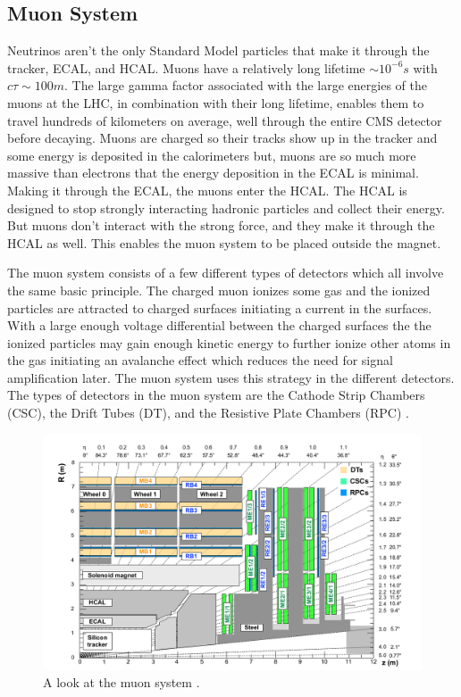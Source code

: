 \subsection{Muon System}
Neutrinos aren't the only Standard Model particles that make it through the tracker, ECAL, and HCAL. Muons have a relatively long lifetime $\sim 10^{-6} s$  with $c\tau \sim 100 m$. The large gamma factor associated with the large energies of the muons at the LHC, in combination with their long lifetime, enables them to travel hundreds of kilometers on average, well through the entire CMS detector before decaying. Muons are charged so their tracks show up in the tracker and some energy is deposited in the calorimeters but, muons are so much more massive than electrons that the energy deposition in the ECAL is minimal. Making it through the ECAL, the muons enter the HCAL. The HCAL is designed to stop strongly interacting hadronic particles and collect their energy. But muons don't interact with the strong force, and they make it through the HCAL as well. This enables the muon system to be placed outside the magnet.

The muon system consists of a few different types of detectors which all involve the same basic principle. The charged muon ionizes some gas and the ionized particles are attracted to charged surfaces initiating a current in the surfaces. With a large enough voltage differential between the charged surfaces the the ionized particles may gain enough kinetic energy to further ionize other atoms in the gas initiating an avalanche effect which reduces the need for signal amplification later. The muon system uses this strategy in the different detectors. The types of detectors in the muon system are the Cathode Strip Chambers (CSC), the Drift Tubes (DT), and the Resistive Plate Chambers (RPC) \cite{tdr}.

\begin{figure}[h!]
  \centering
  \includegraphics[width=5.5in]{images/muon_system.png}
  \caption[A look at the muon system.]
   {A look at the muon system \cite{muonsys}.}
  \label{fig:muonsysfig}
\end{figure}

